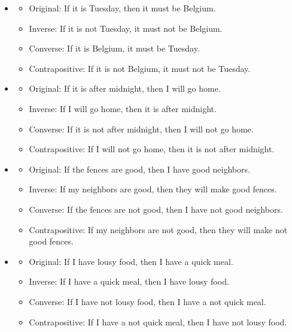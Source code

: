 \documentclass{article}
\theoremstyle{definition}
\begin{document}
	\vspace{0.25cm}
	\begin{itemize}
		\item[(1)]
		\begin{itemize}
			\item Original: If it is Tuesday, then it must be Belgium.
			\item Inverse: If it is not Tuesday, it must not be Belgium.
			\item Converse: If it is Belgium, it must be Tuesday.
			\item Contrapositive: If it is not Belgium, it must not be Tuesday.
		\end{itemize}
		\item[(2)]
		\begin{itemize}
			\item Original: If it is after midnight, then I will go home.
			\item Inverse: If I will go home, then it is after midnight.
			\item Converse: If it is not after midnight, then I will not go home.
			\item Contrapositive: If I will not go home, then it is not after midnight.
		\end{itemize}
		\item[(3)]
		\begin{itemize}
			\item Original: If the fences are good, then I have good neighbors.
			\item Inverse: If my neighbors are good, then they will make good fences.
			\item Converse: If the fences are not good, then I have not good neighbors.
			\item Contrapositive: If my neighbors are not good, then they will make not good fences.
		\end{itemize}
		\item[(4)]
		\begin{itemize}
			\item Original: If I have lousy food, then I have a quick meal.
			\item Inverse: If I have a quick meal, then I have lousy food.
			\item Converse: If I have not lousy food, then I have a not quick meal.
			\item Contrapositive: If I have a not quick meal, then I have not lousy food.
		\end{itemize}
	\end{itemize}
\end{document}

